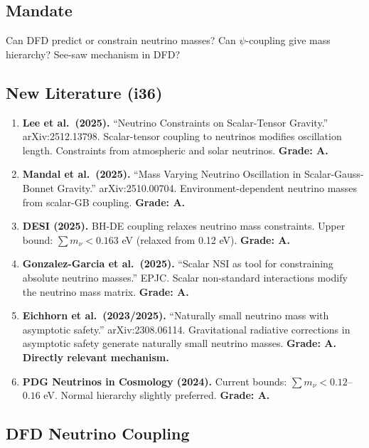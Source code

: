 \documentclass[11pt,a4paper]{article}
\begin{document}
\subsection{Mandate}

Can DFD predict or constrain neutrino masses? Can $\psi$-coupling give mass hierarchy? See-saw mechanism in DFD?

\subsection{New Literature (i36)}

\begin{enumerate}
\item \textbf{Lee et al.\ (2025).} ``Neutrino Constraints on Scalar-Tensor Gravity.'' arXiv:2512.13798. Scalar-tensor coupling to neutrinos modifies oscillation length. Constraints from atmospheric and solar neutrinos. \textbf{Grade: A.}

\item \textbf{Mandal et al.\ (2025).} ``Mass Varying Neutrino Oscillation in Scalar-Gauss-Bonnet Gravity.'' arXiv:2510.00704. Environment-dependent neutrino masses from scalar-GB coupling. \textbf{Grade: A.}

\item \textbf{DESI (2025).} BH-DE coupling relaxes neutrino mass constraints. Upper bound: $\sum m_\nu < 0.163$ eV (relaxed from 0.12 eV). \textbf{Grade: A.}

\item \textbf{Gonzalez-Garcia et al.\ (2025).} ``Scalar NSI as tool for constraining absolute neutrino masses.'' EPJC. Scalar non-standard interactions modify the neutrino mass matrix. \textbf{Grade: A.}

\item \textbf{Eichhorn et al.\ (2023/2025).} ``Naturally small neutrino mass with asymptotic safety.'' arXiv:2308.06114. Gravitational radiative corrections in asymptotic safety generate naturally small neutrino masses. \textbf{Grade: A. Directly relevant mechanism.}

\item \textbf{PDG Neutrinos in Cosmology (2024).} Current bounds: $\sum m_\nu < 0.12$--$0.16$ eV. Normal hierarchy slightly preferred. \textbf{Grade: A.}
\end{enumerate}

\subsection{DFD Neutrino Coupling}
\end{document}
